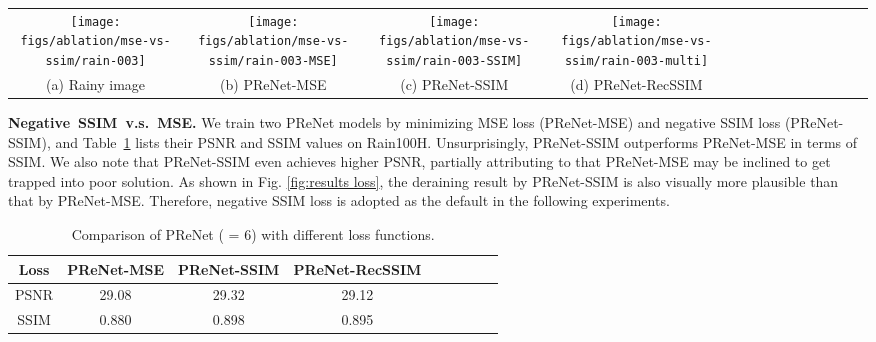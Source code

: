 \documentclass[10pt,twocolumn,letterpaper]{article}
\begin{document}
\begin{figure*}[!htb]\footnotesize
	\centering
	\setlength{\tabcolsep}{1pt}


	\begin{tabular}{cccccccccccccc}
		\texttt{[image: figs/ablation/mse-vs-ssim/rain-003]}  &
		\texttt{[image: figs/ablation/mse-vs-ssim/rain-003-MSE]} &
		\texttt{[image: figs/ablation/mse-vs-ssim/rain-003-SSIM]}&
		\texttt{[image: figs/ablation/mse-vs-ssim/rain-003-multi]}\\
		(a) Rainy image & (b) PReNet-MSE & (c) PReNet-SSIM & (d) PReNet-RecSSIM \\
		
		
	\end{tabular}
	\caption{Visual quality comparison of PReNet models trained by different loss functions, including single MSE loss (PReNet-MSE), single negative SSIM loss (PReNet-SSIM) and recursive negative SSIM supervision (PReNet-RecSSIM). }
	\label{fig:results loss}
\end{figure*}

\vspace{.05in}
\noindent \textbf{Negative~SSIM~v.s.~MSE.}
We train two PReNet models by minimizing MSE loss (PReNet-MSE) and negative SSIM loss (PReNet-SSIM), and Table~\ref{table:ablation loss} lists their PSNR and SSIM values on Rain100H.
Unsurprisingly, PReNet-SSIM outperforms PReNet-MSE in terms of SSIM.
We also note that PReNet-SSIM even achieves higher PSNR, partially attributing to that PReNet-MSE may be inclined to get trapped into poor solution.
As shown in Fig. \ref{fig:results loss}, the deraining result by PReNet-SSIM is also visually more plausible than that by PReNet-MSE.
Therefore, negative SSIM loss is adopted as the default in the following experiments.

\begin{table}[!htb]\small
	\caption{Comparison of PReNet ( = 6) with different loss functions. }
	\centering
	\begin{tabular}{c|cc|cccccc}
		\hline
		
		\hline
		Loss    & PReNet-MSE  &  PReNet-SSIM  & PReNet-RecSSIM \\
		\hline
		PSNR    & 29.08       &  29.32        & 29.12          \\
		SSIM    & 0.880       &  0.898        & 0.895          \\
		\hline
		
		\hline
	\end{tabular}
	\label{table:ablation loss}
\end{table}
\end{document}

